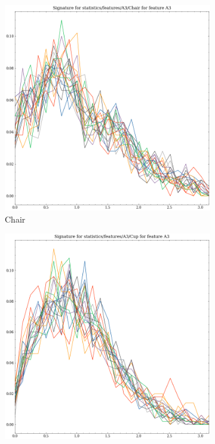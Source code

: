 \begin{figure}[ht]
    
    \begin{subfigure}[b]{0.23\textwidth}
        \includegraphics[width=\textwidth]{assets/feature_extraction/A3/Chair.png}
        \caption{Chair}
        \label{fig:features-statistics-A3-i}    
    \end{subfigure}
    \hfill
    \begin{subfigure}[b]{0.23\textwidth}
        \includegraphics[width=\textwidth]{assets/feature_extraction/A3/Cup.png}

\end{subfigure}
\end{figure}
